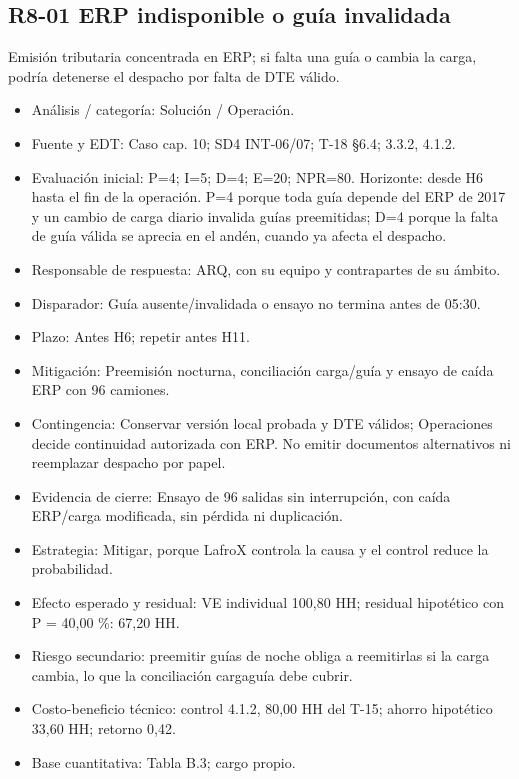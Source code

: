 \subsection*{R8-01 \textemdash{} ERP indisponible o guía invalidada}

Emisión tributaria concentrada en ERP; si falta una guía o cambia la carga, podría detenerse el despacho por falta de DTE válido.

\begin{itemize}[leftmargin=*,itemsep=3pt]
\item Análisis / categoría: Solución / Operación.
\item Fuente y EDT: Caso cap. 10; SD4 INT-06/07; T-18 §6.4; 3.3.2, 4.1.2.
\item Evaluación inicial: P=4; I=5; D=4; E=20; NPR=80. Horizonte: desde H6 hasta el fin de la operación. P=4 porque toda guía depende del ERP de 2017 y un cambio de carga diario invalida guías preemitidas; D=4 porque la falta de guía válida se aprecia en el andén, cuando ya afecta el despacho.
\item Responsable de respuesta: ARQ, con su equipo y contrapartes de su ámbito.
\item Disparador: Guía ausente/invalidada o ensayo no termina antes de 05:30.
\item Plazo: Antes H6; repetir antes H11.
\item Mitigación: Preemisión nocturna, conciliación carga/guía y ensayo de caída ERP con 96 camiones.
\item Contingencia: Conservar versión local probada y DTE válidos; Operaciones decide continuidad autorizada con ERP. No emitir documentos alternativos ni reemplazar despacho por papel.
\item Evidencia de cierre: Ensayo de 96 salidas sin interrupción, con caída ERP/carga modificada, sin pérdida ni duplicación.
\item Estrategia: Mitigar, porque LafroX controla la causa y el control reduce la probabilidad.
\item Efecto esperado y residual: VE individual 100,80 HH; residual hipotético con P = 40,00 \%: 67,20 HH.
\item Riesgo secundario: preemitir guías de noche obliga a reemitirlas si la carga cambia, lo que la conciliación carga\textendash{}guía debe cubrir.
\item Costo-beneficio técnico: control 4.1.2, 80,00 HH del T-15; ahorro hipotético 33,60 HH; retorno 0,42.
\item Base cuantitativa: Tabla B.3; cargo propio.
\end{itemize}


